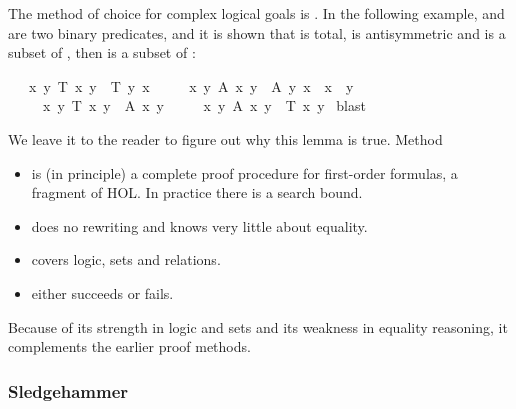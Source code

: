 \begin{isabellebody}
\begin{isamarkuptext}
The method of choice for complex logical goals is . In the
following example,  and  are two binary predicates, and it
is shown that  is total,  is antisymmetric and  is
a subset of , then  is a subset of :%
\end{isamarkuptext}%
\isamarkuptrue%
\isamarkupfalse%
\isanewline
\ \ {}{}\ {}x\ y{}\ T\ x\ y\ {}\ T\ y\ x{}\isanewline
\ \ \ \ \ {}x\ y{}\ A\ x\ y\ {}\ A\ y\ x\ {}\ x\ {}\ y{}\isanewline
\ \ \ \ \ {}x\ y{}\ T\ x\ y\ {}\ A\ x\ y\ {}\isanewline
\ \ \ {}\ {}x\ y{}\ A\ x\ y\ {}\ T\ x\ y{}\isanewline
%
\isadelimproof
%
\endisadelimproof
%
\isatagproof
{}\isamarkupfalse%
\ blast%
\endisatagproof
{\isafoldproof}%
%
\isadelimproof
%
\endisadelimproof
%
\begin{isamarkuptext}%
We leave it to the reader to figure out why this lemma is true.
Method 
\begin{itemize}
\item is (in principle) a complete proof procedure for first-order formulas,
  a fragment of HOL. In practice there is a search bound.
\item does no rewriting and knows very little about equality.
\item covers logic, sets and relations.
\item either succeeds or fails.
\end{itemize}
Because of its strength in logic and sets and its weakness in equality reasoning, it complements the earlier proof methods.


\subsubsection{Sledgehammer}


\end{isamarkuptext}
\end{isabellebody}
